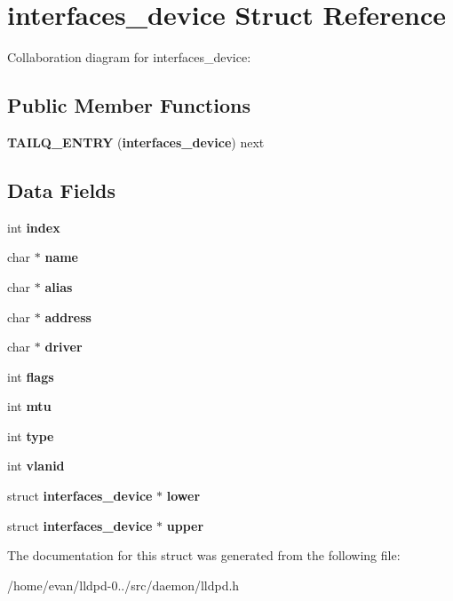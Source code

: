 \section{interfaces\-\_\-device \-Struct \-Reference}
\label{structinterfaces__device}


\-Collaboration diagram for interfaces\-\_\-device\-:
\subsection*{\-Public \-Member \-Functions}
\begin{DoxyCompactItemize}
\item 
{\bfseries \-T\-A\-I\-L\-Q\-\_\-\-E\-N\-T\-R\-Y} ({\bf interfaces\-\_\-device}) next\label{structinterfaces__device_a8f83c00ef50a0d3626f5c3ad5f420dc5}

\end{DoxyCompactItemize}
\subsection*{\-Data \-Fields}
\begin{DoxyCompactItemize}
\item 
int {\bfseries index}\label{structinterfaces__device_a750b5d744c39a06bfb13e6eb010e35d0}

\item 
char $\ast$ {\bfseries name}\label{structinterfaces__device_a5ac083a645d964373f022d03df4849c8}

\item 
char $\ast$ {\bfseries alias}\label{structinterfaces__device_a9027b352db4085a0122952932d065705}

\item 
char $\ast$ {\bfseries address}\label{structinterfaces__device_a879a8cdf605d02f8af8b2e216b8764f2}

\item 
char $\ast$ {\bfseries driver}\label{structinterfaces__device_a129a7813daee3387f3932182eb7dc3f7}

\item 
int {\bfseries flags}\label{structinterfaces__device_ac8bf36fe0577cba66bccda3a6f7e80a4}

\item 
int {\bfseries mtu}\label{structinterfaces__device_a5f8594e356005c64e4a2625755b6c849}

\item 
int {\bfseries type}\label{structinterfaces__device_ac765329451135abec74c45e1897abf26}

\item 
int {\bfseries vlanid}\label{structinterfaces__device_a4dee209aee66d549762fb8e87aea1836}

\item 
struct {\bf interfaces\-\_\-device} $\ast$ {\bfseries lower}\label{structinterfaces__device_a55a29adb272bf9d469aac0dd78a9046c}

\item 
struct {\bf interfaces\-\_\-device} $\ast$ {\bfseries upper}\label{structinterfaces__device_a2a91ae5dd4215b28b839654fd7c11287}

\end{DoxyCompactItemize}


\-The documentation for this struct was generated from the following file\-:\begin{DoxyCompactItemize}
\item 
/home/evan/lldpd-\/0../src/daemon/lldpd.\-h\end{DoxyCompactItemize}
